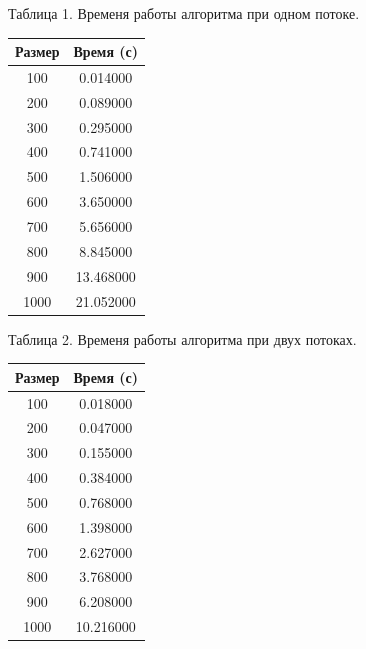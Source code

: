 \documentclass[12pt]{report}
\begin{document}
	\begin{minipage}{0.5\textwidth}
		\begin{center}
			Таблица 1. Временя работы алгоритма при одном потоке.
			
			\begin{tabular}{|c c|}
				\hline
				Размер & Время (с) \\
				\hline
				100 & 0.014000\\
				\hline
				200 & 0.089000\\
				\hline
				300 & 0.295000\\
				\hline
				400 & 0.741000\\
				\hline
				500 & 1.506000\\
				\hline
				600 & 3.650000\\
				\hline
				700 & 5.656000\\
				\hline
				800 & 8.845000\\
				\hline
				900 & 13.468000\\
				\hline
				1000 & 21.052000\\
				\hline
			\end{tabular}
		\end{center}
	\end{minipage}
	\hfill
	\begin{minipage}{0.5\textwidth}
		\begin{center}
			Таблица 2. Временя работы алгоритма при двух потоках.
			
			\begin{tabular}{|c c|}
				\hline
				Размер & Время (с) \\
				\hline
				100 & 0.018000\\
				\hline
				200 & 0.047000\\
				\hline
				300 & 0.155000\\
				\hline
				400 & 0.384000\\
				\hline
				500 & 0.768000\\
				\hline
				600 & 1.398000\\
				\hline
				700 & 2.627000\\
				\hline
				800 & 3.768000\\
				\hline
				900 & 6.208000\\
				\hline
				1000 & 10.216000\\
				\hline
			\end{tabular}
			
			
		\end{center}
	\end{minipage}
\end{document}
